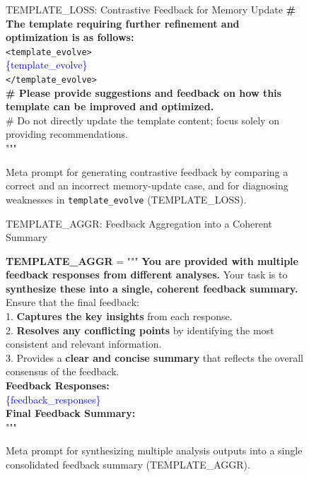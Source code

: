 \begin{figure}[!ht]
\begin{AIboxBlueFrame}{TEMPLATE\_LOSS: Contrastive Feedback for Memory Update}
{\textbf{\# The template requiring further refinement and optimization is as follows:} \\

\texttt{<template\_evolve>} \\
\textcolor{blue}{\{template\_evolve\}} \\
\texttt{</template\_evolve>} \\

\textbf{\# Please provide suggestions and feedback on how this template can be improved and optimized.} \\
\# Do not directly update the template content; focus solely on providing recommendations. \\
"""
}
\end{AIboxBlueFrame}
\vspace{-1em}
\caption{Meta prompt for generating contrastive feedback by comparing a correct and an incorrect memory-update case, and for diagnosing weaknesses in \texttt{template\_evolve} (TEMPLATE\_LOSS).}
\label{prompt:template_loss}
\end{figure}


\begin{figure}[!ht] 
\begin{AIboxBlueFrame}{TEMPLATE\_AGGR: Feedback Aggregation into a Coherent Summary}
\vspace{1mm}
{\footnotesize
\setlength{\parindent}{0pt}
\setlength{\parskip}{2pt}

\textbf{TEMPLATE\_AGGR} = """ \textbf{You are provided with multiple feedback responses from different analyses.} Your task is to \textbf{synthesize these into a single, coherent feedback summary.} Ensure that the final feedback: \\
1. \textbf{Captures the key insights} from each response. \\
2. \textbf{Resolves any conflicting points} by identifying the most consistent and relevant information. \\
3. Provides a \textbf{clear and concise summary} that reflects the overall consensus of the feedback. \\

\textbf{Feedback Responses:} \\
\textcolor{blue}{\{feedback\_responses\}} \\

\textbf{Final Feedback Summary:} \\
"""
}
\end{AIboxBlueFrame}
\vspace{-1em}
\caption{Meta prompt for synthesizing multiple analysis outputs into a single consolidated feedback summary (TEMPLATE\_AGGR).}
\label{prompt:template_aggr}
\end{figure}

